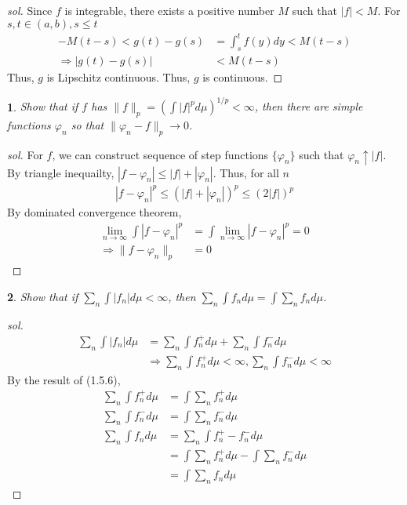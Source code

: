 \documentclass{report}
\newtheorem{ex}{}[section]
\begin{document}
\begin{proof}[sol]
Since $f$ is integrable, there exists a positive number $M$ such that $|f| < M$. For $s,t \in (a,b), s\le t$
\begin{align*}
-M(t-s) < g(t) - g(s) &= \int^t_s f(y)dy < M(t-s)\\
\Rightarrow |g(t) - g(s)| &< M(t-s)
\end{align*}
Thus, $g$ is Lipschitz continuous. Thus, $g$ is continuous.
\end{proof}
\begin{ex}
Show that if $f$ has $\|f\|_p = (\int |f|^pd\mu)^{1/p} < \infty$, then there are simple functions $\varphi_n$ so that $\|\varphi_n - f\|_p \to 0$.
\end{ex}
\begin{proof}[sol]
For $f$, we can construct sequence of step functions $\{\varphi_n\}$ such that $\varphi_n \uparrow |f|$. By triangle inequailty, $|f - \varphi_n| \le |f| + |\varphi_n|$. Thus, for all $n$
\begin{align*}
    |f - \varphi_n|^p \le (|f| + |\varphi_n|)^p \le (2|f|)^p
\end{align*}
By dominated convergence theorem,
\begin{align*}
    \lim_{n\to\infty}\int |f - \varphi_n|^p &= \int \lim_{n\to\infty}|f - \varphi_n|^p = 0\\
    \Rightarrow \|f - \varphi_n\|_p &= 0
\end{align*}
\end{proof}
\begin{ex}
Show that if $\sum_n \int |f_n|d\mu < \infty$, then $\sum_n \int f_n d\mu = \int \sum_n f_n d\mu$.
\end{ex}
\begin{proof}[sol]
\begin{align*}
    \sum_n \int |f_n|d\mu &= \sum_n \int f_n^+d\mu + \sum_n \int f_n^-d\mu\\
    &\Rightarrow \sum_n \int f_n^+d\mu<\infty, \sum_n \int f_n^-d\mu < \infty
\end{align*}
By the result of (1.5.6),
\begin{align*}
    \sum_n \int f_n^+d\mu &= \int \sum_n f_n^+d\mu\\
    \sum_n \int f_n^-d\mu &= \int \sum_n f_n^-d\mu\\
    \sum_n \int f_nd\mu &= \sum_n \int f_n^+ - f_n^-d\mu\\
    &= \int \sum_n f_n^+d\mu - \int \sum_n f_n^-d\mu\\
    &= \int \sum_n f_nd\mu
\end{align*}
\end{proof}
\end{document}
